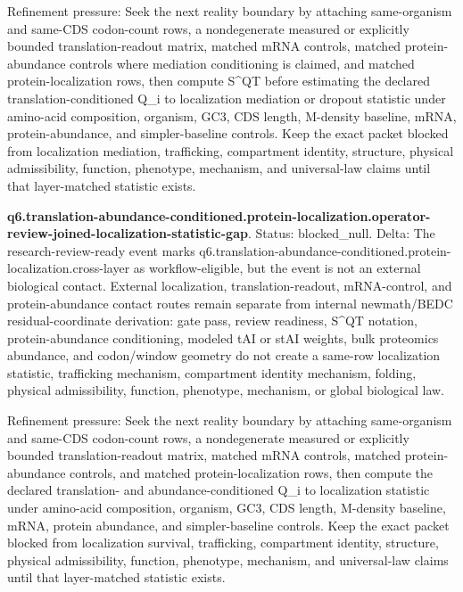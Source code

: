 Refinement pressure: Seek the next reality boundary by attaching same-organism and same-CDS codon-count rows, a nondegenerate measured or explicitly bounded translation-readout matrix, matched mRNA controls, matched protein-abundance controls where mediation conditioning is claimed, and matched protein-localization rows, then compute S\textasciicircum{}QT before estimating the declared translation-conditioned Q\_i to localization mediation or dropout statistic under amino-acid composition, organism, GC3, CDS length, M-density baseline, mRNA, protein-abundance, and simpler-baseline controls. Keep the exact packet blocked from localization mediation, trafficking, compartment identity, structure, physical admissibility, function, phenotype, mechanism, and universal-law claims until that layer-matched statistic exists.

\textbf{q6.translation-abundance-conditioned.protein-localization.operator-review-joined-localization-statistic-gap}. Status: blocked\_null. Delta: The research-review-ready event marks q6.translation-abundance-conditioned.protein-localization.cross-layer as workflow-eligible, but the event is not an external biological contact. External localization, translation-readout, mRNA-control, and protein-abundance contact routes remain separate from internal newmath/BEDC residual-coordinate derivation: gate pass, review readiness, S\textasciicircum{}QT notation, protein-abundance conditioning, modeled tAI or stAI weights, bulk proteomics abundance, and codon/window geometry do not create a same-row localization statistic, trafficking mechanism, compartment identity mechanism, folding, physical admissibility, function, phenotype, mechanism, or global biological law.

Refinement pressure: Seek the next reality boundary by attaching same-organism and same-CDS codon-count rows, a nondegenerate measured or explicitly bounded translation-readout matrix, matched mRNA controls, matched protein-abundance controls, and matched protein-localization rows, then compute the declared translation- and abundance-conditioned Q\_i to localization statistic under amino-acid composition, organism, GC3, CDS length, M-density baseline, mRNA, protein abundance, and simpler-baseline controls. Keep the exact packet blocked from localization survival, trafficking, compartment identity, structure, physical admissibility, function, phenotype, mechanism, and universal-law claims until that layer-matched statistic exists.

